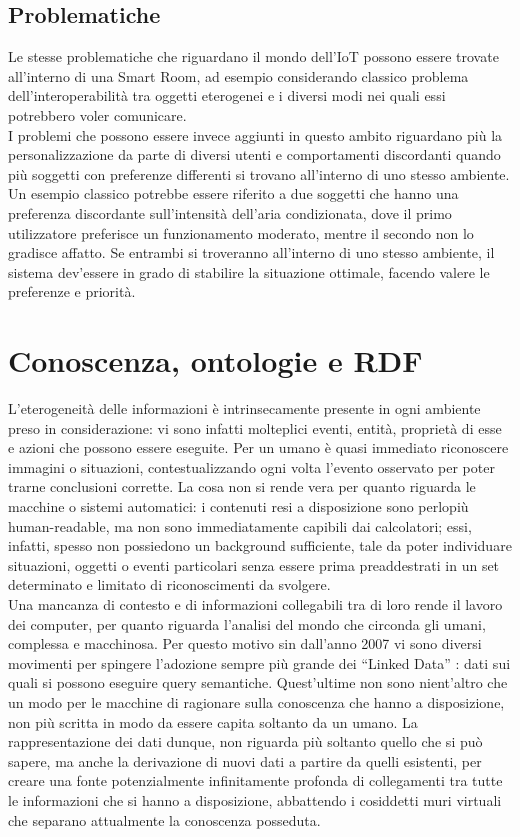 \documentclass[12pt,a4paper,openright,oneside]{report}
\newcommand{\quotes}[1]{``#1''}
\begin{document}
\subsection{Problematiche}
Le stesse problematiche che riguardano il mondo dell'IoT possono essere trovate all'interno di una Smart Room, ad esempio considerando classico problema dell'interoperabilità tra oggetti eterogenei e i diversi modi nei quali essi potrebbero voler comunicare.\\

I problemi che possono essere invece aggiunti in questo ambito riguardano più la personalizzazione da parte di diversi utenti e comportamenti discordanti quando più soggetti con preferenze differenti si trovano all'interno di uno stesso ambiente. Un esempio classico potrebbe essere riferito a due soggetti che hanno una preferenza discordante sull'intensità dell'aria condizionata, dove il primo utilizzatore preferisce un funzionamento moderato, mentre il secondo non lo gradisce affatto. Se entrambi si troveranno all'interno di uno stesso ambiente, il sistema dev'essere in grado di stabilire la situazione ottimale, facendo valere le preferenze e priorità.\\


\section{Conoscenza, ontologie e RDF}
L'eterogeneità delle informazioni è intrinsecamente presente in ogni ambiente preso in considerazione: vi sono infatti molteplici eventi, entità, proprietà di esse e azioni che possono essere eseguite. Per un umano è quasi immediato riconoscere immagini o situazioni, contestualizzando ogni volta l'evento osservato per poter trarne conclusioni corrette. La cosa non si rende vera per quanto riguarda le macchine o sistemi automatici: i contenuti resi a disposizione sono perlopiù human-readable, ma non sono immediatamente capibili dai calcolatori; essi, infatti, spesso non possiedono un background sufficiente, tale da poter individuare situazioni, oggetti o eventi particolari senza essere prima preaddestrati in un set determinato e limitato di riconoscimenti da svolgere.\\

Una mancanza di contesto e di informazioni collegabili tra di loro rende il lavoro dei computer, per quanto riguarda l'analisi del mondo che circonda gli umani, complessa e macchinosa. Per questo motivo sin dall'anno 2007 vi sono diversi movimenti per spingere l'adozione sempre più grande dei \quotes{Linked Data} \cite{linkeddata}: dati sui quali si possono eseguire query semantiche. Quest'ultime non sono nient'altro che un modo per le macchine di ragionare sulla conoscenza che hanno a disposizione, non più scritta in modo da essere capita soltanto da un umano. La rappresentazione dei dati dunque, non riguarda più soltanto quello che si può sapere, ma anche la derivazione di nuovi dati a partire da quelli esistenti, per creare una fonte potenzialmente infinitamente profonda di collegamenti tra tutte le informazioni che si hanno a disposizione, abbattendo i cosiddetti muri virtuali che separano attualmente la conoscenza posseduta.\\
\end{document}
